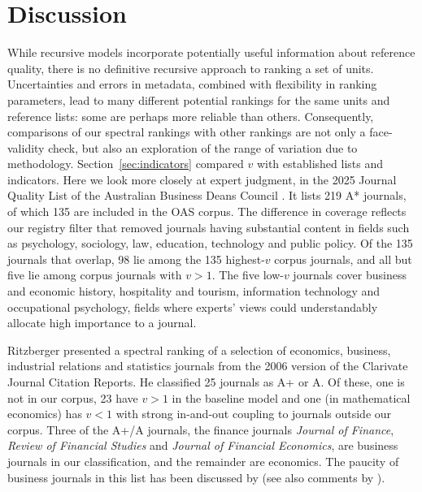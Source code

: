 \section{Discussion}
\label{sec:discussion}

While recursive models incorporate potentially useful information about reference quality, there is no definitive recursive approach to ranking a set of units. Uncertainties and errors in metadata, combined with flexibility in ranking parameters, lead to many different potential rankings for the same units and reference lists: some are perhaps more reliable than others. Consequently, comparisons of our spectral rankings with other rankings are not only a face-validity check, but also an exploration of the range of variation due to methodology. Section~\ref{sec:indicators} compared $v$ with established lists and indicators. Here we look more closely at expert judgment, in the 2025 Journal Quality List of the Australian Business Deans Council \textcite[][ABDC]{australianbusinessdeanscouncil2025ABDCJournal2025}. It lists 219 A* journals, of which 135 are included in the OAS corpus. The difference in coverage reflects our registry filter that removed journals having substantial content in fields such as psychology, sociology, law, education, technology and public policy. Of the 135 journals that overlap, 98 lie among the 135 highest-$v$ corpus journals, and all but five lie among corpus journals with $v>1$. The five low-$v$ journals cover business and economic history, hospitality and tourism, information technology and occupational psychology, fields where experts' views could understandably allocate high importance to a journal.

Ritzberger \citep{ritzbergerRankingJournalsEconomics2008} presented a spectral ranking of a selection of economics, business, industrial relations and statistics journals from the 2006 version of the Clarivate Journal Citation Reports. He classified 25 journals as A+ or A. Of these, one is not in our corpus, 23 have $v>1$ in the baseline model and one (in mathematical economics) has $v<1$ with strong in-and-out coupling to journals outside our corpus. Three of the A+/A journals, the finance journals \textit{Journal of Finance}, \textit{Review of Financial Studies} and \textit{Journal of Financial Economics}, are business journals in our classification, and the remainder are economics. The paucity of business journals in this list has been discussed by \textcite{albersMisleadingRankingsResearch2009} (see also comments by \textcite{ritzbergerMisleadingRankingsResearch2009}). 

